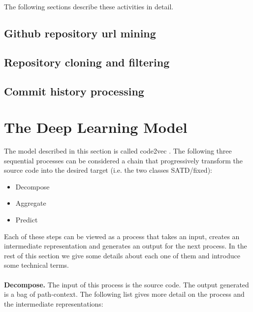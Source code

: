 The following sections describe these activities in detail.

\subsection{Github repository url mining}




\subsection{Repository cloning and filtering}
\subsection{Commit history processing}
\section{The Deep Learning Model}
The model described in this section is called code2vec \cite{alon2019code2vec}.
The following three sequential processes can be considered a chain that progressively transform the source code into the desired target (i.e. the two classes SATD/fixed):
\begin{itemize}
    \item Decompose
    \item Aggregate
    \item Predict
\end{itemize}

\noindent Each of these steps can be viewed as a process that takes an input, creates an intermediate representation and generates an output for the next process.
In the rest of this section we give some details about each one of them and introduce some technical terms. 
\\
\\
\noindent \textbf{Decompose.} The input of this process is the source code. The output generated is a bag of path-context. The following list gives more detail on the process and the intermediate representations:

